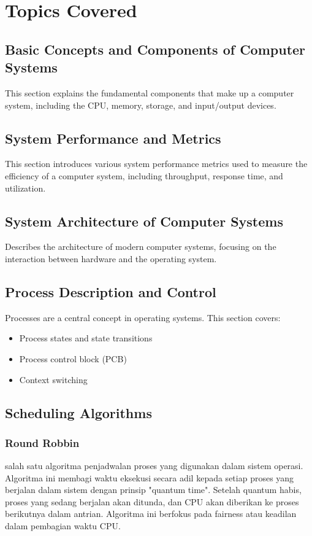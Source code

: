 \documentclass[12pt]{article}
\begin{document}
\section{Topics Covered}

\subsection{Basic Concepts and Components of Computer Systems}
This section explains the fundamental components that make up a computer system, including the CPU, memory, storage, and input/output devices.

\subsection{System Performance and Metrics}
This section introduces various system performance metrics used to measure the efficiency of a computer system, including throughput, response time, and utilization.

\subsection{System Architecture of Computer Systems}
Describes the architecture of modern computer systems, focusing on the interaction between hardware and the operating system.

\subsection{Process Description and Control}
Processes are a central concept in operating systems. This section covers:
\begin{itemize}
    \item Process states and state transitions
    \item Process control block (PCB)
    \item Context switching
\end{itemize}

\subsection{Scheduling Algorithms}
\subsubsection{Round Robbin}
salah satu algoritma penjadwalan proses yang digunakan dalam sistem operasi. Algoritma ini membagi waktu eksekusi secara adil kepada setiap proses yang berjalan dalam sistem dengan prinsip "quantum time". Setelah quantum habis, proses yang sedang berjalan akan ditunda, dan CPU akan diberikan ke proses berikutnya dalam antrian. Algoritma ini berfokus pada fairness atau keadilan dalam pembagian waktu CPU.
\end{document}
